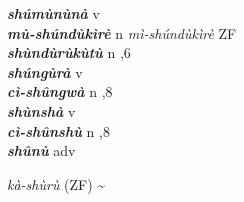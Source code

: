\begin{multicols}{2}
{{\bfseries\itshape shúmùnùnà}} \relax  v  \relax   \relax  {} \relax   \relax  \\
{{\bfseries\itshape mù-shúndùkìrè}} \relax  n   \relax  \textit{mì-shúndùkìrè} \relax  ZF\\
{{\bfseries\itshape shùndùrùkùtù}} \relax  n  ,6  \relax   \relax  \\
{{\bfseries\itshape shúngùrà}} \relax  v  \relax   \relax  {} \relax   \relax  \\
{{\bfseries\itshape cì-shûngwà}} \relax  n  ,8  \relax  \\
{{\bfseries\itshape shùnshà}} \relax  v  \relax   \relax  {} \relax   \relax  \\
{{\bfseries\itshape cì-shûnshù}} \relax  n  ,8  \relax   \relax  \\
{{\bfseries\itshape shûnù}} \relax  adv  \relax   \relax  {} \relax   \relax  \\
{\textit{kà-shùrù} (ZF) {\textasciitilde}

}
\end{multicols}
